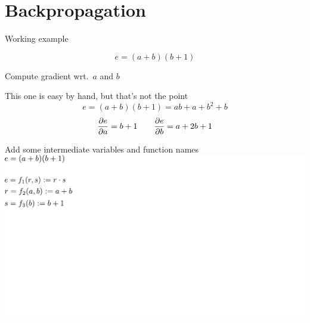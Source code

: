 \documentclass[12pt,aspectratio=169,handout]{beamer}
\begin{document}
\section{Backpropagation}

\begin{frame}{Working example}
	
	$$
	e = (a + b)(b + 1)
	$$
	
	Compute gradient wrt.\ $a$ and $b$
	
	\bigskip
	
	\pause
	
	\begin{block}{This one is easy by hand, but that's not the point}
		$$
		e = (a + b)(b + 1) = ab + a + b^2 + b
		$$
		$$
		\pdv{e}{a} = b + 1 \qquad \pdv{e}{b} = a + 2b + 1
		$$
	\end{block}
	
\end{frame}



\begin{frame}{Add some intermediate variables and function names}
	\includegraphics[width=1.1\linewidth]{img/backprop01.pdf}
\end{frame}
\end{document}
